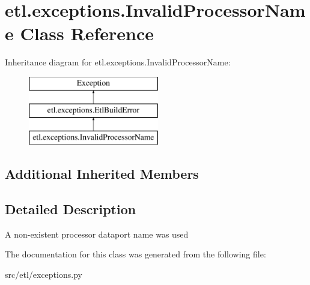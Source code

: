 \hypertarget{classetl_1_1exceptions_1_1InvalidProcessorName}{\section{etl.\-exceptions.\-Invalid\-Processor\-Name Class Reference}
\label{classetl_1_1exceptions_1_1InvalidProcessorName}
}
Inheritance diagram for etl.\-exceptions.\-Invalid\-Processor\-Name\-:\begin{figure}[H]
\begin{center}
\leavevmode
\includegraphics[height=3.000000cm]{classetl_1_1exceptions_1_1InvalidProcessorName}
\end{center}
\end{figure}
\subsection*{Additional Inherited Members}


\subsection{Detailed Description}
\begin{DoxyVerb}A non-existent processor dataport name was used\end{DoxyVerb}
 

The documentation for this class was generated from the following file\-:\begin{DoxyCompactItemize}
\item 
src/etl/exceptions.\-py\end{DoxyCompactItemize}
